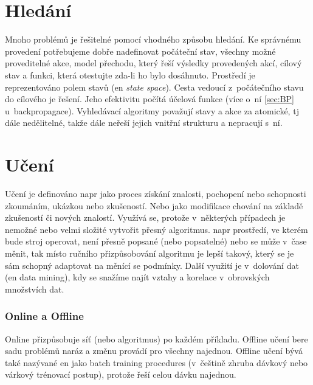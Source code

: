 \documentclass[12pt]{report}			%
\begin{document}
	\section{Hledání}
	\label{sec:search}	
	Mnoho problémů je řešitelné pomocí vhodného způsobu hledání. Ke správnému provedení potřebujeme dobře nadefinovat počáteční stav, všechny možné proveditelné akce, model přechodu, který řeší výsledky provedených akcí, cílový stav a funkci, která otestujte zda-li ho bylo dosáhnuto. Prostředí je reprezentováno polem stavů (\gls{en} \emph{state space}). Cesta vedoucí z~počátečního stavu do cílového je řešení. Jeho efektivitu počítá účelová funkce (více o~ní \ref{sec:BP} u~backpropagace). Vyhledávací algoritmy považují stavy a akce za atomické, \gls{tj} dále nedělitelné, takže dále neřeší jejich vnitřní strukturu a nepracují s~ní.\parencite[\gls{str}]{AIAMA}
	
	\section{Učení}
	\label{sec:learning}	
	Učení je definováno \gls{napr} jako proces získání znalosti, pochopení nebo schopnosti zkoumáním, ukázkou nebo zkušeností. Nebo jako modifikace chování na základě zkušeností či nových znalostí. Využívá se, protože v~některých případech je nemožné nebo velmi složité vytvořit přesný algoritmus. \Gls{napr}  prostředí, ve kterém bude stroj operovat, není přesně popsané (nebo popsatelné) nebo se může v~čase měnit, tak místo ručního přizpůsobování algoritmu je lepší takový, který se je sám schopný adaptovat na měnící se podmínky. Další využití je v~dolování dat (\gls{en} data mining), kdy se snažíme najít vztahy a korelace v~obrovských množstvích dat. \parencite[\gls{s} 1-3]{introductionML}
	\subsubsection{Online a Offline}
	\label{sec:on-off-lol}
	Online přizpůsobuje síť (nebo algoritmus) po každém příkladu. Offline učení bere sadu problémů naráz a změnu provádí pro všechny najednou. Offline učení bývá také nazývané \gls{en} jako batch training procedures (v~češtině zhruba dávkový nebo várkový trénovací postup), protože řeší celou dávku najednou. \parencite[\gls{s} 54]{NN_introduction-Kriessel} \\
	 
\end{document}
